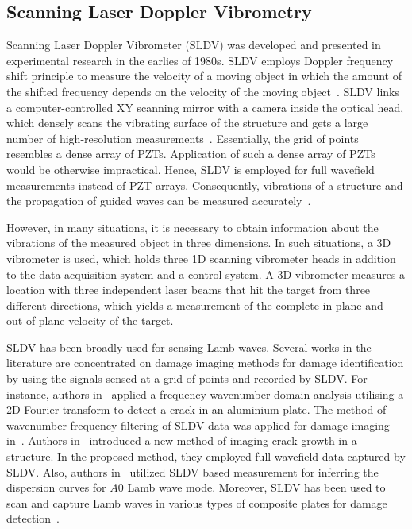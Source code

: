 \subsection{Scanning Laser Doppler Vibrometry} 
Scanning Laser Doppler Vibrometer (SLDV) was developed and presented in experimental research in the earlies of 1980s. 
SLDV employs Doppler frequency shift principle to measure the velocity of a moving object in which the amount of the shifted frequency depends on the velocity of the moving object~\cite{Stanbridge1999}. 
SLDV links a computer-controlled XY scanning mirror with a camera inside the optical head, which densely scans the vibrating surface of the structure and gets a large number of high-resolution measurements~\cite{Helfrick2011}. 
Essentially, the grid of points resembles a dense array of PZTs. 
Application of such a dense array of PZTs would be otherwise impractical.  
Hence, SLDV is employed for full wavefield measurements instead of PZT arrays. 
Consequently, vibrations of a structure and the propagation of guided waves can be measured accurately~\cite{Ostachowicz2014}.

However, in many situations, it is necessary to obtain information about the vibrations of the measured object in three dimensions. 
In such situations, a 3D vibrometer is used, which holds three 1D scanning vibrometer heads in addition to the data acquisition system and a control system.
A 3D vibrometer measures a location with three independent laser beams that hit the target from three different directions, which yields a measurement of the complete in-plane and out-of-plane velocity of the target.

SLDV has been broadly used for sensing Lamb waves. 
Several works in the literature are concentrated on damage imaging methods for damage identification by using the signals sensed at a grid of points and recorded by SLDV.
For instance, authors in~\cite{Yu2013} applied a frequency wavenumber domain analysis utilising a 2D Fourier transform to detect a crack in an aluminium plate. 
The method of wavenumber frequency filtering of SLDV data was applied for damage imaging in~\cite{Ruzzene2007}. 
Authors in~\cite{Kudela2015} introduced a new method of imaging crack growth in a structure.
In the proposed method, they employed full wavefield data captured by SLDV.
Also, authors in~\cite{Harb2015} utilized SLDV based measurement for inferring the dispersion curves for \(A0\) Lamb wave mode. 
Moreover, SLDV has been used to scan and capture Lamb waves in various types of composite plates for damage detection~\cite{Lamboul2013, Radzienski2019,Sohn2011, An2016,Rogge2013,  Tian2015}.

